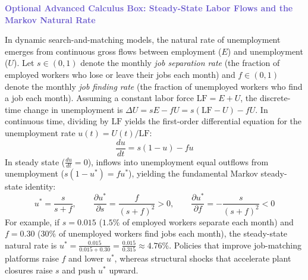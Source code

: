 \documentclass[11pt, a4paper]{article}
\newcommand{\boxheader}[2]{\textbf{\textcolor{#1}{#2}}\par\smallskip}
\begin{document}
\begin{casestudy}
\boxheader{SlateBlue}{Optional Advanced Calculus Box: Steady-State Labor Flows and the Markov Natural Rate}
In dynamic search-and-matching models, the natural rate of unemployment emerges from continuous gross flows between employment ($E$) and unemployment ($U$). Let $s \in (0,1)$ denote the monthly \textit{job separation rate} (the fraction of employed workers who lose or leave their jobs each month) and $f \in (0,1)$ denote the monthly \textit{job finding rate} (the fraction of unemployed workers who find a job each month). Assuming a constant labor force $\text{LF} = E + U$, the discrete-time change in unemployment is $\Delta U = s E - f U = s(\text{LF} - U) - f U$. In continuous time, dividing by $\text{LF}$ yields the first-order differential equation for the unemployment rate $u(t) = U(t)/\text{LF}$:
\[
  \frac{du}{dt} = s(1 - u) - f u
\]
In steady state ($\frac{du}{dt} = 0$), inflows into unemployment equal outflows from unemployment ($s(1 - u^*) = f u^*$), yielding the fundamental Markov steady-state identity:
\[
  u^* = \frac{s}{s + f}, \qquad
  \frac{\partial u^*}{\partial s} = \frac{f}{(s+f)^2} > 0, \qquad
  \frac{\partial u^*}{\partial f} = -\frac{s}{(s+f)^2} < 0
\]
For example, if $s = 0.015$ ($1.5\%$ of employed workers separate each month) and $f = 0.30$ ($30\%$ of unemployed workers find jobs each month), the steady-state natural rate is $u^* = \frac{0.015}{0.015 + 0.30} = \frac{0.015}{0.315} \approx 4.76\%$. Policies that improve job-matching platforms raise $f$ and lower $u^*$, whereas structural shocks that accelerate plant closures raise $s$ and push $u^*$ upward.
\end{casestudy}
\end{document}
